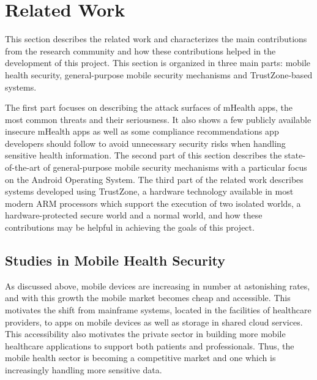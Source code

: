 
% 
% 
\section{Related Work}


This section describes the related work and characterizes the main contributions from the research community and how these contributions helped in the development of this project. This section is organized in three main parts: mobile health security, general-purpose mobile security mechanisms and TrustZone-based systems.

The first part focuses on describing the attack surfaces of mHealth apps, the most common threats and their seriousness. It also shows a few publicly available insecure mHealth apps as well as some compliance recommendations app developers should follow to avoid unnecessary security risks when handling sensitive health information.
The second part of this section describes the state-of-the-art of general-purpose mobile security mechanisms with a particular focus on the Android Operating System.
The third part of the related work describes systems developed using TrustZone, a hardware technology available in most modern ARM processors which support the execution of two isolated worlds, a hardware-protected secure world and a normal world, and how these contributions may be helpful in achieving the goals of this project. 

\subsection{Studies in Mobile Health Security}
\label{sec:mhealth}

As discussed above, mobile devices are increasing in number at astonishing rates, and with this growth the mobile market becomes cheap and accessible. This motivates the shift from mainframe systems, located in the facilities of healthcare providers, to apps on mobile devices as well as storage in shared cloud services. This accessibility also motivates the private sector in building more mobile healthcare applications to support both patients and professionals. Thus, the mobile health sector is becoming a competitive market and one which is increasingly handling more sensitive data.

